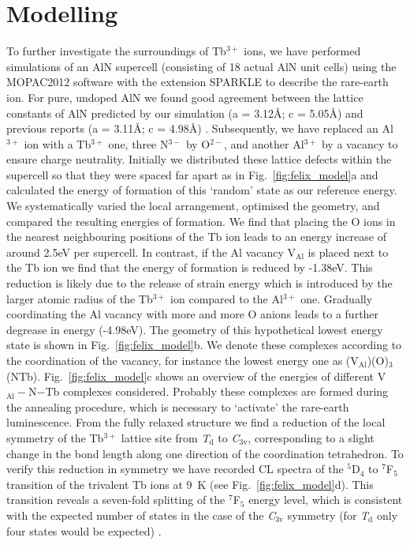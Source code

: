 \documentclass[%
aip,
rsi,%
 amsmath,amssymb,%
 reprint,%
]{revtex4-1}
\begin{document}
\section{Modelling}
\label{sec:model}
To further investigate the surroundings of Tb$^{3+}$ ions, we have performed simulations of an AlN supercell (consisting of 18 actual AlN unit cells) using the MOPAC2012 software \cite{steward12} with the extension SPARKLE \cite{freire10} to describe the rare-earth ion. For pure, undoped AlN we found good agreement between the lattice constants of AlN predicted by our simulation (a = 3.12\AA; c = 5.05\AA) and previous reports (a = 3.11\AA; c = 4.98\AA) \cite{ICDD11}. Subsequently, we have replaced an Al$^{3+}$ ion with a Tb$^{3+}$ one, three N$^{3-}$ by O$^{2-}$, and another Al$^{3+}$ by a vacancy to ensure charge neutrality. Initially we distributed these lattice defects within the supercell so that they were spaced far apart as in Fig.~\ref{fig:felix_model}a and calculated the energy of formation of this \lq{random}\rq{} state as our reference energy. We systematically varied the local arrangement, optimised the geometry, and compared the resulting energies of formation. We find that placing the O ions in the nearest neighbouring positions of the Tb ion leads to an energy increase of around 2.5eV per supercell. In contrast, if the Al vacancy V$_\text{Al}$ is placed next to the Tb ion we find that the energy of formation is reduced by -1.38eV. This reduction is likely due to the release of strain energy which is introduced by the larger atomic radius of the Tb$^{3+}$ ion compared to the Al$^{3+}$ one. Gradually coordinating the Al vacancy with more and more O anions leads to a further degrease in energy (-4.98eV). The geometry of this hypothetical lowest energy state is shown in Fig.~\ref{fig:felix_model}b. We denote these complexes according to the coordination of the vacancy, for instance the lowest energy one as (V$_\text{Al}$)(O)$_3$(NTb). Fig.~\ref{fig:felix_model}c shows an overview of the energies of different V$_\text{Al}-$N$-$Tb complexes considered. Probably these complexes are formed during the annealing procedure, which is necessary to \lq{activate}\rq{} the rare-earth luminescence. From the fully relaxed structure we find a reduction of the local symmetry of the Tb$^{3+}$ lattice site from \textit{T$_\text{d}$} to \textit{C$_\text{3v}$}, corresponding to a slight change in the bond length along one direction of the coordination tetrahedron. To verify this reduction in symmetry we have recorded CL spectra of the $^5$D$_4$ to $^7$F$_5$ transition of the trivalent Tb ions at 9~K (see Fig.~\ref{fig:felix_model}d). This transition reveals a seven-fold splitting of the $^7$F$_5$ energy level, which is consistent with the expected number of states in the case of the \textit{C$_\text{3v}$} symmetry (for \textit{T$_\text{d}$} only four states would be expected) \cite{henderson05}.
\end{document}
